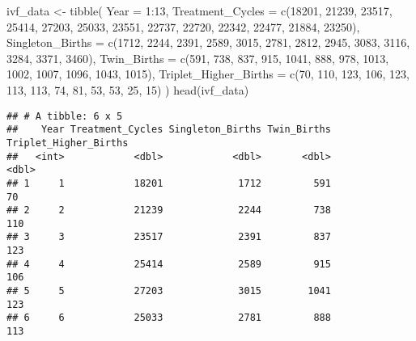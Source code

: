 \documentclass[
]{article}
\newenvironment{Shaded}{\begin{snugshade}}{\end{snugshade}}
\newcommand{\AttributeTok}[1]{\textcolor[rgb]{0.77,0.63,0.00}{#1}}
\newcommand{\DecValTok}[1]{\textcolor[rgb]{0.00,0.00,0.81}{#1}}
\newcommand{\FunctionTok}[1]{\textcolor[rgb]{0.00,0.00,0.00}{#1}}
\newcommand{\NormalTok}[1]{#1}
\newcommand{\OtherTok}[1]{\textcolor[rgb]{0.56,0.35,0.01}{#1}}
\newcommand{\SpecialCharTok}[1]{\textcolor[rgb]{0.00,0.00,0.00}{#1}}
\begin{document}
\begin{Shaded}
\begin{Highlighting}[]
\NormalTok{ivf\_data }\OtherTok{\textless{}{-}} \FunctionTok{tibble}\NormalTok{(}
  \AttributeTok{Year =} \DecValTok{1}\SpecialCharTok{:}\DecValTok{13}\NormalTok{,}
  \AttributeTok{Treatment\_Cycles =} \FunctionTok{c}\NormalTok{(}\DecValTok{18201}\NormalTok{, }\DecValTok{21239}\NormalTok{, }\DecValTok{23517}\NormalTok{, }\DecValTok{25414}\NormalTok{, }\DecValTok{27203}\NormalTok{, }\DecValTok{25033}\NormalTok{, }\DecValTok{23551}\NormalTok{, }\DecValTok{22737}\NormalTok{, }\DecValTok{22720}\NormalTok{, }\DecValTok{22342}\NormalTok{, }\DecValTok{22477}\NormalTok{, }\DecValTok{21884}\NormalTok{, }\DecValTok{23250}\NormalTok{),}
  \AttributeTok{Singleton\_Births =} \FunctionTok{c}\NormalTok{(}\DecValTok{1712}\NormalTok{, }\DecValTok{2244}\NormalTok{, }\DecValTok{2391}\NormalTok{, }\DecValTok{2589}\NormalTok{, }\DecValTok{3015}\NormalTok{, }\DecValTok{2781}\NormalTok{, }\DecValTok{2812}\NormalTok{, }\DecValTok{2945}\NormalTok{, }\DecValTok{3083}\NormalTok{, }\DecValTok{3116}\NormalTok{, }\DecValTok{3284}\NormalTok{, }\DecValTok{3371}\NormalTok{, }\DecValTok{3460}\NormalTok{),}
  \AttributeTok{Twin\_Births =} \FunctionTok{c}\NormalTok{(}\DecValTok{591}\NormalTok{, }\DecValTok{738}\NormalTok{, }\DecValTok{837}\NormalTok{, }\DecValTok{915}\NormalTok{, }\DecValTok{1041}\NormalTok{, }\DecValTok{888}\NormalTok{, }\DecValTok{978}\NormalTok{, }\DecValTok{1013}\NormalTok{, }\DecValTok{1002}\NormalTok{, }\DecValTok{1007}\NormalTok{, }\DecValTok{1096}\NormalTok{, }\DecValTok{1043}\NormalTok{, }\DecValTok{1015}\NormalTok{),}
  \AttributeTok{Triplet\_Higher\_Births =} \FunctionTok{c}\NormalTok{(}\DecValTok{70}\NormalTok{, }\DecValTok{110}\NormalTok{, }\DecValTok{123}\NormalTok{, }\DecValTok{106}\NormalTok{, }\DecValTok{123}\NormalTok{, }\DecValTok{113}\NormalTok{, }\DecValTok{113}\NormalTok{, }\DecValTok{74}\NormalTok{, }\DecValTok{81}\NormalTok{, }\DecValTok{53}\NormalTok{, }\DecValTok{53}\NormalTok{, }\DecValTok{25}\NormalTok{, }\DecValTok{15}\NormalTok{)}
\NormalTok{)}
\FunctionTok{head}\NormalTok{(ivf\_data)}
\end{Highlighting}
\end{Shaded}

\begin{verbatim}
## # A tibble: 6 x 5
##    Year Treatment_Cycles Singleton_Births Twin_Births Triplet_Higher_Births
##   <int>            <dbl>            <dbl>       <dbl>                 <dbl>
## 1     1            18201             1712         591                    70
## 2     2            21239             2244         738                   110
## 3     3            23517             2391         837                   123
## 4     4            25414             2589         915                   106
## 5     5            27203             3015        1041                   123
## 6     6            25033             2781         888                   113
\end{verbatim}
\end{document}
